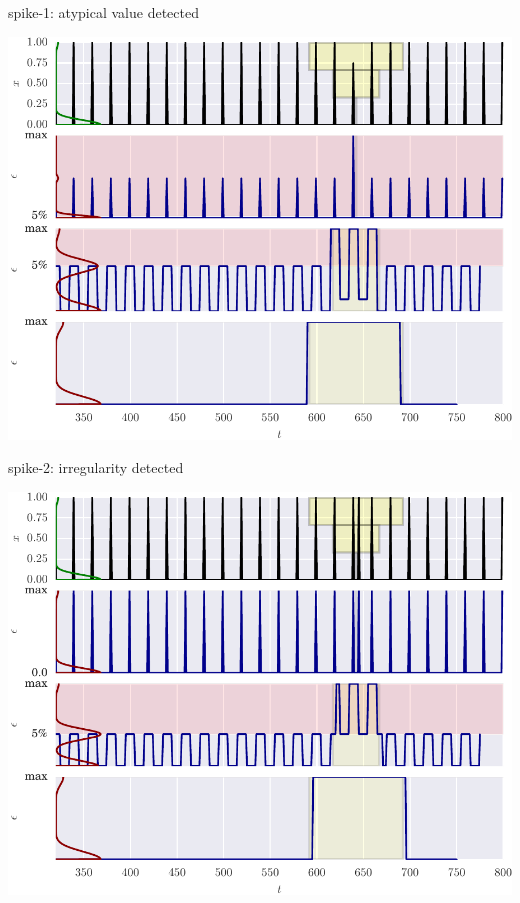 \documentclass{beamer}
\begin{document}
    \begin{frame}{spike-1: atypical value detected}

      \includegraphics[width=\textwidth]{figs/er_spikelv.pdf}


    \end{frame}


    \begin{frame}{spike-2: irregularity detected}

      \includegraphics[width=\textwidth]{figs/er_spikereg.pdf}

    \end{frame}
\end{document}
